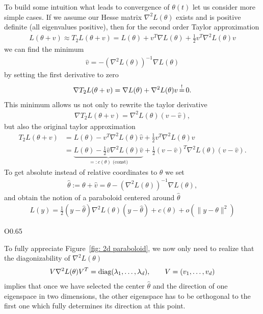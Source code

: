 To build some intuition what leads to convergence of \(\theta(t)\) let us
consider more simple cases. If we assume our Hesse matrix \(\nabla^2
L(\theta)\) exists and is positive definite (all eigenvalues positive), then for
the second order Taylor approximation
%
\begin{align*}
	L(\theta+v) \approx T_2L(\theta+v)
	= L(\theta) + v^T \nabla L(\theta) + \tfrac12 v^T \nabla^2 L(\theta) v
\end{align*}
%
we can find the minimum 
\begin{align*}
	\hat{v} = -(\nabla^2 L(\theta))^{-1}\nabla L(\theta)
\end{align*}
by setting the first derivative to zero
%
\begin{align*}
	\nabla T_2L(\theta+v) = \nabla L(\theta) + \nabla^2L(\theta) v \xeq{!} 0.
\end{align*}
%
This minimum allows us not only to rewrite the taylor derivative
%
\begin{align*}
	\nabla T_2L(\theta+v) = \nabla^2 L(\theta)(v-\hat{v}),
\end{align*}
%
but also the original taylor approximation
%
\begin{align*}
	T_2L(\theta+v)
	&= L(\theta) - v^T \nabla^2 L(\theta) \hat{v} + \tfrac12 v^T \nabla^2 L(\theta) v \\
	&= \underbrace{L(\theta) - \tfrac12 \hat{v} \nabla^2 L(\theta) \hat{v}}_{=: c(\theta) \text{ (const)}}
	+ \tfrac12 (v-\hat{v})^T \nabla^2 L(\theta)(v-\hat{v}).
\end{align*}
%
To get absolute instead of relative coordinates to \(\theta\) we set
%
\begin{align*}
	\hat{\theta} := \theta + \hat{v} = \theta -(\nabla^2 L(\theta))^{-1}\nabla L(\theta),
\end{align*}
%
and obtain the notion of a paraboloid centered around \(\hat{\theta}\)
%
\begin{align}\label{paraboloid approximation of L}
	L(y) = \tfrac12 (y- \hat{\theta}) \nabla^2 L(\theta) (y-\hat{\theta}) + c(\theta) + o(\|y-\theta\|^2)
\end{align}
%
\begin{wrapfigure}{O}{0.65\textwidth}
	\centering
	\def\svgwidth{0.65\textwidth}
	
	\caption{Assuming \(\hat{\theta}=0\), \(\lambda_1=1, \lambda_2=2\), \(v_1=(\sin(1), \cos(1))\)}
	\label{fig: 2d paraboloid}
\end{wrapfigure}
%
To fully appreciate Figure~\ref{fig: 2d paraboloid}, we now only need to realize
that the diagonizability of \(\nabla^2 L(\theta)\)
%
\begin{align}\label{eq: diagnalization of the Hesse matrix}
	V \nabla^2 L(\theta) V^T
	= \text{diag}(\lambda_1,\dots,\lambda_d), \qquad V=(v_1,\dots, v_d)
\end{align}
%
implies that once we have selected the center \(\hat{\theta}\) and the direction of
one eigenspace in two dimensions, the other eigenspace has to be
orthogonal to the first one which fully determines its direction at this point. 

